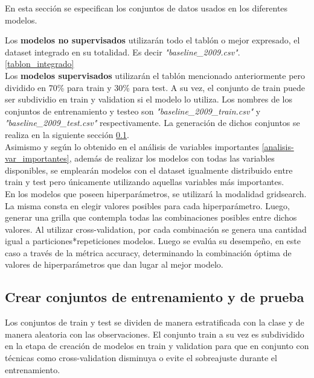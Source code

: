 
En esta sección se especifican los conjuntos de datos usados en los diferentes modelos.

Los \textbf{modelos no supervisados} utilizarán todo el tablón o mejor expresado, el dataset integrado en su totalidad. Es decir \textit{"baseline\_2009.csv"}. \ref{tablon_integrado} \\

Los \textbf{modelos supervisados} utilizarán el tablón mencionado anteriormente pero dividido en 70\% para train y 30\% para test. A su vez, el conjunto de train puede ser subdividio en train y validation si el modelo lo utiliza.
Los nombres de los conjuntos de entrenamiento y testeo son \textit{"baseline\_2009\_train.csv"} y \textit{"baseline\_2009\_test.csv"} respectivamente.
La generación de dichos conjuntos se realiza en la siguiente sección \ref{dataset_train_test}.\\
Asimismo y según lo obtenido en el análisis de variables importantes \ref{analisis-var_importantes}, además de realizar los modelos con todas las variables disponibles, se emplearán modelos con el dataset igualmente distribuido entre train y test pero únicamente utilizando aquellas variables más importantes.\\
En los modelos que poseen hiperparámetros, se utilizará la modalidad gridsearch. La misma consta en elegir valores posibles para cada hiperparámetro. Luego, generar una grilla que contempla todas las combinaciones posibles entre dichos valores. Al utilizar cross-validation, por cada combinación se genera una cantidad igual a particiones*repeticiones modelos. Luego se evalúa su desempeño, en este caso a través de la métrica accuracy, determinando la combinación óptima de valores de hiperparámetros que dan lugar al mejor modelo.





\subsection{Crear conjuntos de entrenamiento y de prueba}\label{dataset_train_test}

Los conjuntos de train y test se dividen de manera estratificada con la clase y de manera aleatoria con las observaciones. El conjunto train a su vez es subdividido en la etapa de creación de modelos en train y validation para que en conjunto con técnicas como cross-validation disminuya o evite el sobreajuste durante el entrenamiento.\\


